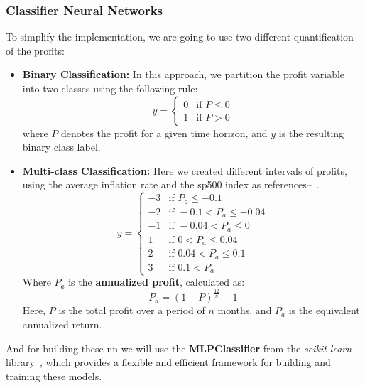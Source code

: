 \documentclass[11pt,english,a4paper,hidelinks]{book}
\begin{document}
\subsubsection{Classifier Neural Networks}

\noindent To simplify the implementation, we are going to use two different quantification of the profits:

\begin{itemize}
    \item \textbf{Binary Classification:} In this approach, we partition the profit variable into two classes using the following rule:
    \begin{equation}
        y = 
        \begin{cases}
            0 & \text{if } P \leq 0 \\
            1 & \text{if } P > 0
        \end{cases}
    \end{equation}
    where \(P\) denotes the profit for a given time horizon, and \(y\) is the resulting binary class label.

    \item \textbf{Multi-class Classification:} Here we created different intervals of profits, using the average inflation rate and the \acrshort{sp500} index as references--~\cite{global_inflation, sp500}.
    \begin{equation}
        y =
        \begin{cases}
            -3 & \text{if } P_a \leq -0.1 \\
            -2 & \text{if } -0.1 < P_a \leq -0.04 \\
            -1 & \text{if } -0.04 < P_a \leq 0 \\
             1 & \text{if } 0 < P_a \leq 0.04 \\
             2 & \text{if } 0.04 < P_a \leq 0.1 \\
             3 & \text{if } 0.1 < P_a
        \end{cases}
    \end{equation}
    \noindent Where \(P_a\) is the \textbf{annualized profit}, calculated as:
    \begin{equation}
        P_a = (1 + P)^{\frac{12}{n}} - 1
    \end{equation}
    \noindent Here, \(P\) is the total profit over a period of \(n\) months, and \(P_a\) is the equivalent annualized return.
\end{itemize}

\noindent And for building these \acrshort{nn} we will use the \textbf{MLPClassifier} from the \textit{scikit-learn} library~\cite{scikit2025mlpclassifier}, which provides a flexible and efficient framework for building and training these models. 
\end{document}
